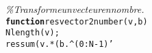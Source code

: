 {\begin{tabbing}
\textit{\%\phantom{x}Transforme\phantom{x}un\phantom{x}vecteur\phantom{x}en\phantom{x}nombre{.}}\\
\texttt{\textbf{function}}\texttt{\phantom{x}res\phantom{x}{=}\phantom{x}vector2number{(}v{,}b{)}}\\
\texttt{N\phantom{x}{=}\phantom{x}length{(}v{)}{;}}\\
\texttt{res\phantom{x}{=}\phantom{x}sum{(}\phantom{x}v{.}{*}{(}\phantom{x}b{.}\textasciicircum{}{(}0{:}N{-}1{)}{'}\phantom{x}{)}\phantom{x}{)}{;}}
\end{tabbing}}